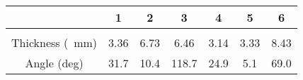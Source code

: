 \documentclass{standalone}
\begin{document}
    \begin{tabular}{c c c c c c c}
        \toprule
        & 1 & 2 & 3 & 4 & 5 & 6 \\ 
        \midrule\\
        \addlinespace[-2ex]
        Thickness (\SI{}{\milli \meter}) & 3.36 & 6.73 & 6.46 & 3.14 & 3.33 & 8.43  \\
        \addlinespace[1.5ex]
        Angle (deg) & 31.7 & 10.4 & 118.7 & 24.9 & 5.1 & 69.0 \\
        \bottomrule
    \end{tabular}
\end{document}

